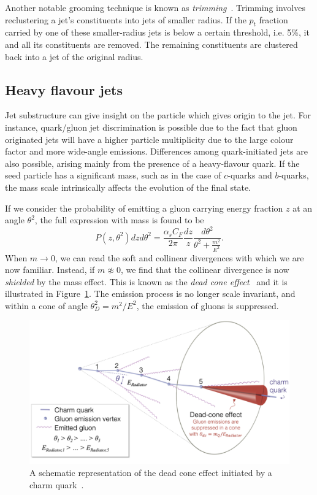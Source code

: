 \documentclass[10pt,a4paper]{book}
\begin{document}
Another notable grooming technique is known as \emph{trimming}~\cite{Krohn:2009th}. Trimming involves reclustering a jet's constituents into jets of smaller radius. If the $p_t$ fraction carried by one of these smaller-radius jets is below a certain threshold, i.e. 5\%, it and all its constituents are removed. The remaining constituents are clustered back into a jet of the original radius.

\subsection{Heavy flavour jets}

Jet substructure can give insight on the particle which gives origin to the jet. For instance, quark/gluon jet discrimination is possible due to the fact that gluon originated jets will have a higher particle multiplicity due to the large colour factor and more wide-angle emissions.
Differences among quark-initiated jets are also possible, arising mainly from the presence of a heavy-flavour quark. If the seed particle has a significant mass, such as in the case of $c$-quarks and $b$-quarks, the mass scale intrinsically affects the evolution of the final state.

If we consider the probability of emitting a gluon carrying energy fraction $z$ at an angle $\theta^2$, the full expression with mass is found to be
\begin{equation}
    P(z,\theta^2)dzd\theta^2 = \frac{\alpha_sC_F}{2\pi}\frac{dz}{z}\frac{d\theta^2}{\theta^2 + \frac{m^2}{E^2}}.
\end{equation}
When $m\rightarrow 0$, we can read the soft and collinear divergences with which we are now familiar. Instead, if $m \not\approx 0$, we find that the collinear divergence is now \emph{shielded} by the mass effect. This is known as the \emph{dead cone effect}~\cite{Dokshitzer:1991fd} and it is illustrated in Figure~\ref{fig:deadcone}. The emission process is no longer scale invariant, and within a cone of angle $\theta_D^2 = m^2/E^2$, the emission of gluons is suppressed.

\begin{figure}
    \centering
    \includegraphics[width=0.75\linewidth]{theory chapter/deadCone.png}
    \caption{A schematic representation of the dead cone effect initiated by a charm quark~\cite{ALICE:2021aqk}.}
    \label{fig:deadcone}
\end{figure}
\end{document}
